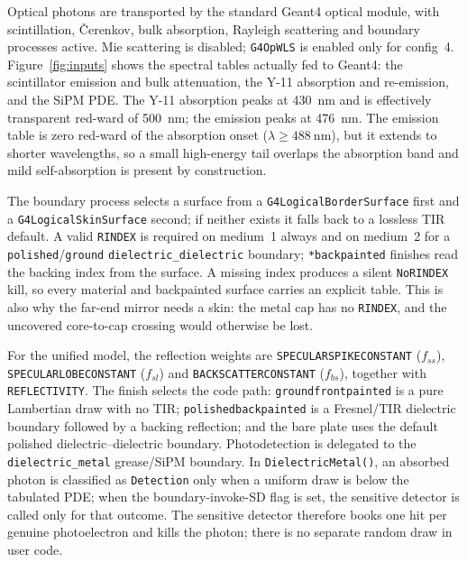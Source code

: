\documentclass[preprint,12pt]{elsarticle}
\newcommand{\gfour}{Geant4}
\begin{document}
Optical photons are transported by the standard \gfour{} optical module, with
scintillation, \v{C}erenkov, bulk absorption, Rayleigh scattering and boundary
processes active. Mie scattering is disabled; \texttt{G4OpWLS} is enabled only
for config~4. Figure~\ref{fig:inputs} shows the spectral tables actually fed to
\gfour: the scintillator emission and bulk attenuation, the Y-11 absorption and
re-emission, and the SiPM PDE. The Y-11 absorption peaks at \SI{430}{\nano\meter}
and is effectively transparent red-ward of \SI{500}{\nano\meter}; the emission
peaks at \SI{476}{\nano\meter}. The emission table is zero red-ward of the
absorption onset ($\lambda\ge\SI{488}{\nano\meter}$), but it extends to shorter
wavelengths, so a small high-energy tail overlaps the absorption band and mild
self-absorption is present by construction.

The boundary process selects a surface from a \texttt{G4LogicalBorderSurface}
first and a \texttt{G4LogicalSkinSurface} second; if neither exists it falls back
to a lossless TIR default. A valid \texttt{RINDEX} is required on medium~1
always and on medium~2 for a \texttt{polished}/\texttt{ground}
\texttt{dielectric\_dielectric} boundary; \texttt{*backpainted} finishes read the
backing index from the surface. A missing index produces a silent
\texttt{NoRINDEX} kill, so every material and backpainted surface carries an
explicit table. This is also why the far-end mirror needs a skin: the metal cap
has no \texttt{RINDEX}, and the uncovered core-to-cap crossing would otherwise be
lost.

For the unified model, the reflection weights are
\texttt{SPECULARSPIKECONSTANT} ($f_{ss}$), \texttt{SPECULARLOBECONSTANT}
($f_{sl}$) and \texttt{BACKSCATTERCONSTANT} ($f_{bs}$), together with
\texttt{REFLECTIVITY}. The finish selects the code path:
\texttt{groundfrontpainted} is a pure Lambertian draw with no TIR;
\texttt{polishedbackpainted} is a Fresnel/TIR dielectric boundary followed by a
backing reflection; and the bare plate uses the default polished
dielectric--dielectric boundary. Photodetection is delegated to the
\texttt{dielectric\_metal} grease/SiPM boundary. In \texttt{DielectricMetal()},
an absorbed photon is classified as \texttt{Detection} only when a uniform draw
is below the tabulated PDE; when the boundary-invoke-SD flag is set, the
sensitive detector is called only for that outcome. The sensitive detector
therefore books one hit per genuine photoelectron and kills the photon; there is
no separate random draw in user code.
\end{document}
